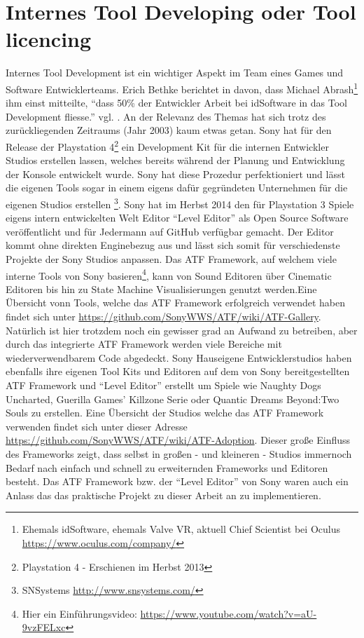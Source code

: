 \documentclass[pagesize, paper=a4, fontsize=12pt,titlepage=true, headings=small, headnosepline, abstractoff, liststotoc, nochapterprefix, plainheadsepline, twoside]{scrreprt}
\begin{document}
\section{Internes Tool Developing oder Tool licencing}
Internes Tool Development ist ein wichtiger Aspekt im Team eines Games und Software Entwicklerteams. Erich Bethke \autocite{Bethke2003} berichtet  in davon, dass Michael Abrash\footnote{Ehemals idSoftware, ehemals Valve VR, aktuell Chief Scientist bei Oculus \url{https://www.oculus.com/company/}} ihm einst mitteilte, “dass 50\% der Entwickler Arbeit bei idSoftware in das Tool Development fliesse.” vgl. . An der Relevanz des Themas hat sich trotz des zurückliegenden Zeitraums (Jahr 2003) kaum etwas getan. Sony hat für den Release der Playstation 4\footnote{Playstation 4 - Erschienen im Herbst 2013} ein Development Kit  für die internen Entwickler Studios  erstellen lassen, welches bereits während der Planung und Entwicklung der Konsole entwickelt wurde. Sony hat diese Prozedur perfektioniert und lässt die eigenen Tools sogar in einem eigens dafür gegründeten Unternehmen für die eigenen Studios erstellen \footnote{SNSystems \url{http://www.snsystems.com/}}. Sony hat im Herbst 2014 den für Playstation 3 Spiele eigens intern entwickelten Welt Editor “Level Editor” als Open Source Software veröffentlicht und für Jedermann auf GitHub verfügbar gemacht. Der Editor kommt ohne direkten Enginebezug aus und lässt sich somit für verschiedenste Projekte der Sony Studios anpassen. Das ATF Framework, auf welchem viele interne Tools von Sony basieren\footnote{Hier ein Einführungsvideo: \url{https://www.youtube.com/watch?v=aU-9vzFELxc}}, kann von Sound Editoren über Cinematic Editoren bis hin zu State Machine Visualisierungen genutzt werden.Eine Übersicht vonn Tools, welche das ATF Framework erfolgreich verwendet haben findet sich unter \url{https://github.com/SonyWWS/ATF/wiki/ATF-Gallery}. Natürlich ist hier trotzdem noch ein gewisser grad an Aufwand zu betreiben, aber durch das integrierte ATF Framework werden viele Bereiche mit wiederverwendbarem Code abgedeckt. Sony Hauseigene  Entwicklerstudios haben ebenfalls ihre eigenen Tool Kits und Editoren auf dem von Sony bereitgestellten ATF Framework und “Level Editor” erstellt um Spiele wie Naughty Dogs Uncharted, Guerilla Games’ Killzone Serie oder Quantic Dreams Beyond:Two Souls zu erstellen. Eine Übersicht der Studios welche das ATF Framework verwenden findet sich unter dieser Adresse \url{https://github.com/SonyWWS/ATF/wiki/ATF-Adoption}. Dieser große Einfluss des Frameworks zeigt, dass selbst in großen - und kleineren - Studios immernoch Bedarf nach einfach und schnell zu erweiternden Frameworks und Editoren besteht. Das ATF Framework bzw. der “Level Editor” von Sony waren auch ein Anlass das das praktische Projekt zu dieser Arbeit an zu implementieren.
\end{document}
